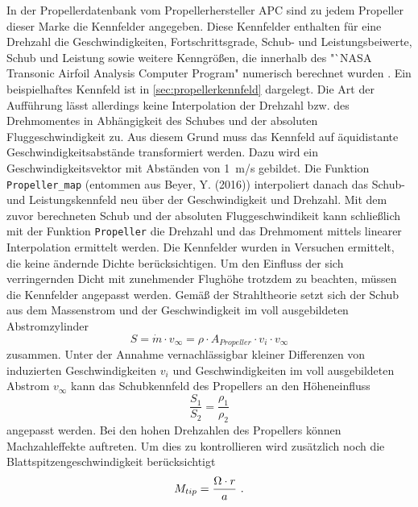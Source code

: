 In der Propellerdatenbank vom Propellerhersteller APC sind zu jedem Propeller dieser Marke die Kennfelder angegeben. Diese Kennfelder enthalten für eine Drehzahl die Geschwindigkeiten, Fortschrittsgrade, Schub- und Leistungsbeiwerte, Schub und Leistung sowie weitere Kenngrößen, die innerhalb des "`NASA Transonic Airfoil Analysis Computer Program"\; numerisch berechnet wurden \cite{apc.theory}. Ein beispielhaftes Kennfeld ist in \ref{sec:propellerkennfeld} dargelegt. Die Art der Aufführung lässt allerdings keine Interpolation der Drehzahl bzw. des Drehmomentes in Abhängigkeit des Schubes und der absoluten Fluggeschwindigkeit zu. Aus diesem Grund muss das Kennfeld auf äquidistante Geschwindigkeitsabstände transformiert werden. Dazu wird ein Geschwindigkeitsvektor mit Abständen von \SI{1}{m/s} gebildet. Die Funktion \texttt{Propeller\_map} (entommen aus Beyer, Y. (2016)) interpoliert danach das Schub- und Leistungskennfeld neu über der Geschwindigkeit und Drehzahl. Mit dem zuvor berechneten Schub und der absoluten Fluggeschwindikeit kann schließlich mit der Funktion \texttt{Propeller} die Drehzahl und das Drehmoment mittels linearer Interpolation ermittelt werden.
Die Kennfelder wurden in Versuchen ermittelt, die keine ändernde Dichte berücksichtigen. Um den Einfluss der sich verringernden Dicht mit zunehmender Flughöhe trotzdem zu beachten, müssen die Kennfelder angepasst werden. Gemäß der Strahltheorie setzt sich der Schub aus dem Massenstrom und der Geschwindigkeit im voll ausgebildeten Abstromzylinder 
\begin{equation}
	S =  \dot{m}\cdot v_{\infty} = \rho\cdot A_{Propeller}\cdot v_i\cdot v_{\infty}
	\label{eq:propellerschub}
\end{equation}
zusammen. Unter der Annahme vernachlässigbar kleiner Differenzen von  induzierten Geschwindigkeiten $v_i$ und Geschwindigkeiten im voll ausgebildeten Abstrom $v_{\infty}$ kann das Schubkennfeld des Propellers an den Höheneinfluss 
\begin{equation}
	\frac{S_1}{S_2} = \frac{\rho_1}{\rho_2}
\end{equation}
angepasst werden.
Bei den hohen Drehzahlen des Propellers können Machzahleffekte auftreten. Um dies zu kontrollieren wird zusätzlich noch die Blattspitzengeschwindigkeit berücksichtigt
\begin{equation}
	M_{tip} = \frac{\Omega\cdot r}{a} ~\text{.}
\end{equation}

